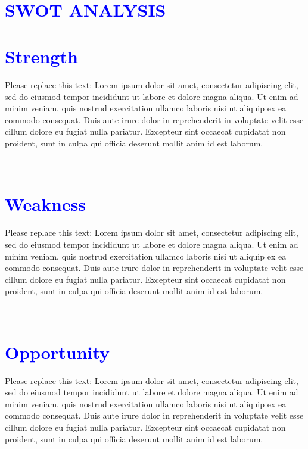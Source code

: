 \documentclass[a4paper, 11pt]{article}
\begin{document}
\ 
\section*{\textcolor{blue}{SWOT ANALYSIS}}

\section*{\textcolor{blue}{Strength}}

Please replace this text: Lorem ipsum dolor sit amet, consectetur adipiscing elit, sed do eiusmod tempor incididunt ut labore et dolore magna aliqua. Ut enim ad minim veniam, quis nostrud exercitation ullamco laboris nisi ut aliquip ex ea commodo consequat. Duis aute irure dolor in reprehenderit in voluptate velit esse cillum dolore eu fugiat nulla pariatur. Excepteur sint occaecat cupidatat non proident, sunt in culpa qui officia deserunt mollit anim id est laborum.



\ 
\section*{\textcolor{blue}{Weakness}}

Please replace this text: Lorem ipsum dolor sit amet, consectetur adipiscing elit, sed do eiusmod tempor incididunt ut labore et dolore magna aliqua. Ut enim ad minim veniam, quis nostrud exercitation ullamco laboris nisi ut aliquip ex ea commodo consequat. Duis aute irure dolor in reprehenderit in voluptate velit esse cillum dolore eu fugiat nulla pariatur. Excepteur sint occaecat cupidatat non proident, sunt in culpa qui officia deserunt mollit anim id est laborum.



\ 
\section*{\textcolor{blue}{Opportunity}}

Please replace this text: Lorem ipsum dolor sit amet, consectetur adipiscing elit, sed do eiusmod tempor incididunt ut labore et dolore magna aliqua. Ut enim ad minim veniam, quis nostrud exercitation ullamco laboris nisi ut aliquip ex ea commodo consequat. Duis aute irure dolor in reprehenderit in voluptate velit esse cillum dolore eu fugiat nulla pariatur. Excepteur sint occaecat cupidatat non proident, sunt in culpa qui officia deserunt mollit anim id est laborum.
\end{document}
